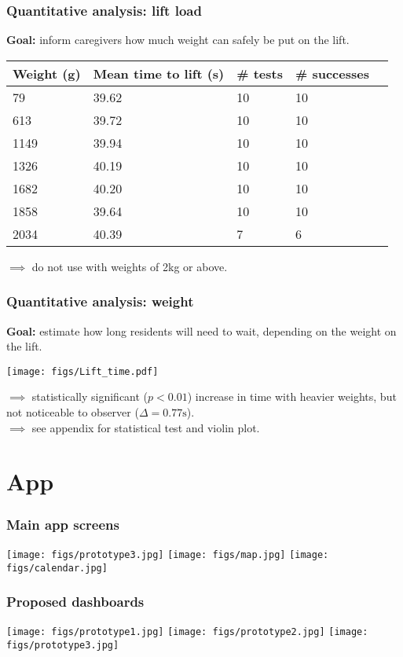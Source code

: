 \documentclass{beamer}
\begin{document}
\begin{frame}
  \frametitle{Quantitative analysis: lift load}
  {\bf Goal: } inform caregivers how much weight can safely be put on the lift.
  \begin{center}
    \begin{tabular}{llllr}
      {\bf Weight (g)} & {\bf Mean time to lift (s)} & {\bf \# tests} & {\bf \# successes}\\
      \hline
      79 & 39.62  & 10 & 10  \\
      613 & 39.72 & 10 & 10 \\
      1149 & 39.94 & 10 & 10  \\
      1326 & 40.19 & 10 & 10 \\
      1682 & 40.20 & 10 & 10 \\
      1858 & 39.64 & 10 & 10  \\
      2034 & 40.39 & 7 & 6
    \end{tabular}
  \end{center}
  $\implies$ do not use with weights of 2kg or above. 
\end{frame}

\begin{frame}
  \frametitle{Quantitative analysis: weight}
  {\bf Goal: } estimate how long residents will need to wait, depending on the weight on the lift.
  \begin{center}
    \texttt{[image: figs/Lift\_time.pdf]}
  \end{center}
  $\implies$ statistically significant ($p < 0.01$) increase in time with heavier weights, but not noticeable to observer ($\Delta = 0.77\text{s}$). \\
  $\implies$ see appendix for statistical test and violin plot.
\end{frame}

\section{App}
\begin{frame}
  \frametitle{Main app screens}
  \begin{center}
    \texttt{[image: figs/prototype3.jpg]}
    \texttt{[image: figs/map.jpg]}
    \texttt{[image: figs/calendar.jpg]}
  \end{center}
\end{frame}

\begin{frame}
  \frametitle{Proposed dashboards}
  \begin{center}
    \texttt{[image: figs/prototype1.jpg]}
    \texttt{[image: figs/prototype2.jpg]}
    \texttt{[image: figs/prototype3.jpg]}
  \end{center}
\end{frame}
\end{document}
